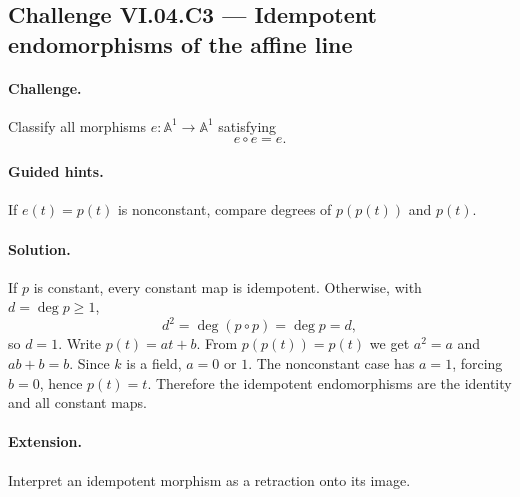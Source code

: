 \subsection*{Challenge VI.04.C3 --- Idempotent endomorphisms of the affine line}
\label{chal:vi04-c3}
\paragraph{Challenge.}
Classify all morphisms \(e:\mathbb A^1\to\mathbb A^1\) satisfying
\[
e\circ e=e.
\]
\ifdefined\FullProblemDossiers
\paragraph{Guided hints.}  If \(e(t)=p(t)\) is nonconstant, compare degrees of
\(p(p(t))\) and \(p(t)\).
\paragraph{Solution.}
If \(p\) is constant, every constant map is idempotent.  Otherwise, with \(d=\deg p\ge1\),
\[
d^2=\deg(p\circ p)=\deg p=d,
\]
so \(d=1\).  Write \(p(t)=at+b\).  From \(p(p(t))=p(t)\) we get
\(a^2=a\) and \(ab+b=b\).  Since \(k\) is a field, \(a=0\) or \(1\).  The nonconstant
case has \(a=1\), forcing \(b=0\), hence \(p(t)=t\).  Therefore the idempotent
endomorphisms are the identity and all constant maps.
\paragraph{Extension.}  Interpret an idempotent morphism as a retraction onto its image.
\fi
